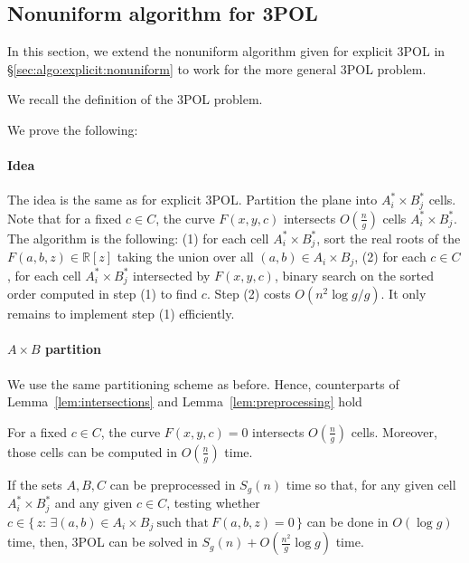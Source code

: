 \subsection{Nonuniform algorithm for 3POL}
\label{sec:algo:implicit:nonuniform}

In this section, we extend the nonuniform algorithm given for explicit 3POL in
\S\ref{sec:algo:explicit:nonuniform} to work for the more general 3POL
problem.

We recall the definition of the 3POL problem.
\ProblemPOLImplicit*

We prove the following:
\TheoremPOLNonuniformImplicit*

\paragraph{Idea}
The idea is the same as for explicit 3POL\@. Partition the plane
into $A^*_i \times B^*_j$ cells.
Note that for a fixed $c \in C$, the curve $F(x,y,c)$ intersects $O(\frac ng)$
cells $A^*_i \times B^*_j$. The algorithm is the following: (1) for each cell
$A^*_i \times B^*_j$, sort the real roots of the $F(a,b,z)
\in \mathbb{R}[z]$ taking the union over all $(a,b) \in A_i \times B_j$,
(2) for each $c \in C$,
for each cell $A^*_i \times B^*_j$ intersected by $F(x,y,c)$, binary search on
the sorted order computed in step (1) to find $c$. Step (2) costs $O(n^2
\log g / g)$. It only remains to implement step (1) efficiently.

\paragraph{$A \times B$ partition}
We use the same partitioning scheme as before. Hence, counterparts of
Lemma~\ref{lem:intersections}
and
Lemma~\ref{lem:preprocessing}
hold
\begin{lemma}\label{lem:intersections-implicit}
    For a fixed \(c \in C\), the curve $F(x,y,c)=0$ intersects $O(\frac ng)$ cells.
    Moreover, those cells can be computed in $O(\frac ng)$ time.
\end{lemma}
\begin{lemma}\label{lem:preprocessing-implicit}
    If the sets $A,B,C$ can be preprocessed in $S_g(n)$ time so that,
    for any given cell $A^*_i \times B^*_j$ and any given $c \in C$, testing whether
    $c \in \{\, z \colon\, \exists(a,b) \in A_i \times B_j~\text{such that}~F(a,b,z) = 0\,\}$
    can be done in
    $O(\log g)$ time, then, 3POL can be solved in
    $S_g(n)+O(\frac{n^2}{g}\log g)$ time.
\end{lemma}

